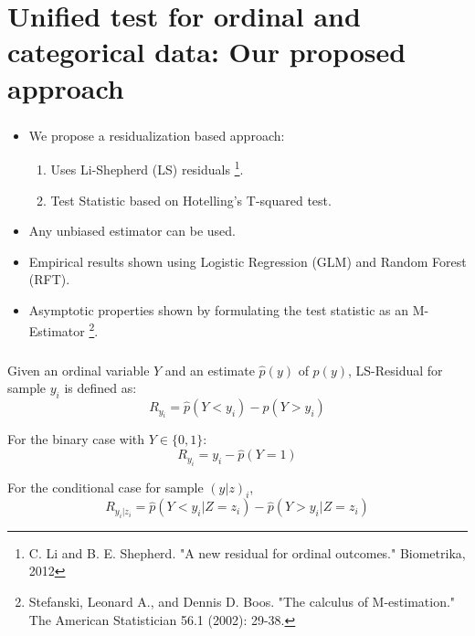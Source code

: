 \documentclass{beamer}
\begin{document}
\section{Unified test for ordinal and categorical data: Our proposed approach}
\begin{frame}
	\frametitle{}
	\begin{itemize}
		\setlength\itemsep{1em}
		\item We propose a residualization based approach:
			\begin{enumerate}
				\item Uses Li-Shepherd (LS) residuals \footnote{C. Li and B. E. Shepherd. "A new residual for ordinal outcomes." Biometrika, 2012}.
				\item Test Statistic based on Hotelling's T-squared test.
			\end{enumerate}
		\item Any unbiased estimator can be used.
		\item Empirical results shown using Logistic Regression (GLM) and Random Forest (RFT).
		\item Asymptotic properties shown by formulating the test statistic as an M-Estimator \footnote{Stefanski, Leonard A., and Dennis D. Boos. "The calculus of M-estimation." The American Statistician 56.1 (2002): 29-38.}.
	\end{itemize}
\end{frame}


\begin{frame}
	\frametitle{}
	Given an ordinal variable $ Y $ and an estimate $ \hat{p}(y) $ of $
	p(y) $, LS-Residual for sample $ y_i $ is defined as:
	$$ R_{y_i} = \hat{p}(Y < y_i) - \hat{p}(Y > y_i) $$
	\vspace{1em}

	For the binary case with $ Y \in \{0, 1\} $:
	$$ R_{y_i} = y_i - \hat{p}(Y = 1) $$
	\vspace{1em}

	For the conditional case for sample $ (y|z)_i $,
	$$ R_{y_i | z_i} = \hat{p}(Y < y_i | Z=z_i) - \hat{p}(Y>y_i|Z=z_i) $$

\end{frame}
\end{document}
